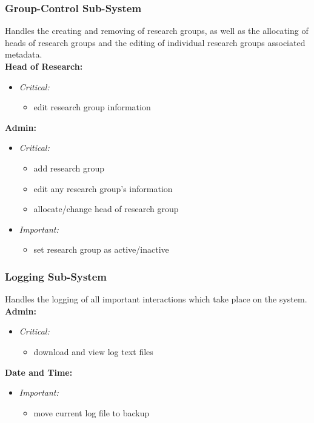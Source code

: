 \documentclass{article}
\begin{document}
			\subsubsection{Group-Control Sub-System}\label{subsubsec:priority-group}
				Handles the creating and removing of research groups, as well as the allocating of heads of research groups and the editing of individual research groups associated metadata.\\
				[3mm]
				\textbf{Head of Research:}
				\begin{itemize}					
					\item \textit{Critical:}
					\begin{itemize}
						\item edit research group information
					\end{itemize}
				\end{itemize}
				\textbf{Admin:}
				\begin{itemize}
					\item \textit{Critical:}
					\begin{itemize}
						\item add research group
						\item edit any research group's information
						\item allocate/change head of research group
					\end{itemize}
					\item \textit{Important:}
					\begin{itemize}
						\item set research group as active/inactive
					\end{itemize}
				\end{itemize}
				
			\subsubsection{Logging Sub-System}\label{subsubsec:priority-logging}
				Handles the logging of all important interactions which take place on the system.\\
				[3mm]
				\textbf{Admin:}
				\begin{itemize}
					\item \textit{Critical:}
					\begin{itemize}
						\item download and view log text files
					\end{itemize}
				\end{itemize}
				\textbf{Date and Time:}
				\begin{itemize}
					\item \textit{Important:}
					\begin{itemize}
						\item move current log file to backup
					\end{itemize}
				\end{itemize}
			
\end{document}
